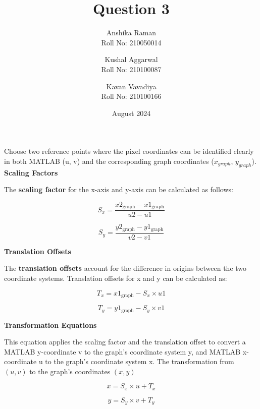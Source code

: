 \documentclass[a4paper,12pt]{article}
\title{Question 3}
\author{Anshika Raman \\ Roll No: 210050014
    \and Kushal Aggarwal \\ Roll No: 210100087
    \and Kavan Vavadiya \\ Roll No: 210100166}
\date{August 2024}
\begin{document}
\maketitle

\renewcommand{\cftsecleader}{\cftdotfill{\cftdotsep}}

\noindent Choose two reference points where the pixel coordinates can be identified clearly in both MATLAB (u, v) and the corresponding graph coordinates ($x_{graph}$, $y_{graph}$).  \\

\noindent \textbf{Scaling Factors}

\noindent The \textbf{scaling factor} for the x-axis and y-axis can be calculated as follows:

\begin{equation}
S_x = \frac{x2_{\text{graph}} - x1_{\text{graph}}}{u2 - u1}
\end{equation}

\begin{equation}
S_y = \frac{y2_{\text{graph}} - y1_{\text{graph}}}{v2 - v1}
\end{equation}

\noindent \textbf{Translation Offsets}

\noindent The \textbf{translation offsets} account for the difference in origins between the two coordinate systems. Translation offsets for x and y can be calculated as:

\begin{equation}
T_x = x1_{\text{graph}} - S_x \times u1
\end{equation}

\begin{equation}
T_y = y1_{\text{graph}} - S_y \times v1
\end{equation}

\noindent \textbf{Transformation Equations}

\noindent This equation applies the scaling factor and the translation offset to convert a MATLAB y-coordinate v to the graph’s coordinate system y, and MATLAB x-coordinate u to the graph's coordinate system x. The transformation from $(u, v)$ to the graph’s coordinates $(x, y)$

\begin{equation}
x = S_x \times u + T_x
\end{equation}

\begin{equation}
y = S_y \times v + T_y
\end{equation}
\end{document}
